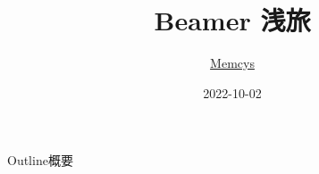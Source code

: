 \documentclass[x11names,aspectratio=32]{beamer}
\title{Beamer 浅旅}
\author{\href{https://github.com/Memcys/DIY-LaTeX}{Memcys}}
\institute{School of Physical Sciences}
\date{2022-10-02}
\begin{document}
\begin{frame}
    \titlepage
\end{frame}

\begin{frame}{Outline}{概要}
    \tableofcontents
\end{frame}



\end{document}
